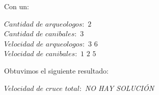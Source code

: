  Con un:
 \begin{flushleft} 
  	$Cantidad$ $de$ $arqueologos:$ $2 $  \\
	$Cantidad$ $de$ $canibales:$ $3$ \\ 
	$Velocidad$ $de$ $arqueologos:$ $3$ $6$ \\
	$Velocidad$ $de$ $canibales:$ $1$ $2$ $5$  \\
\end{flushleft}
  Obtuvimos el siguiente resultado:
   \begin{flushleft}   
$Velocidad$ $de$ $cruce$ $total:$ \textit{NO HAY SOLUCI\'ON} \\
\end{flushleft}

